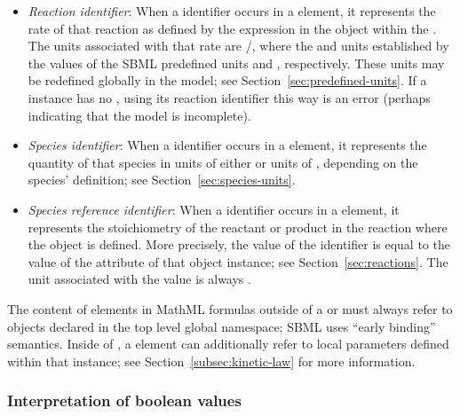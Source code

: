 \begin{itemize}
\begin{itemize}
  \item \emph{Reaction identifier}: When a \Reaction identifier
    occurs in a  element, it represents the rate of that
    reaction as defined by the  expression in
      the \KineticLaw object within the \Reaction.  The
    units associated with that rate are
      /, where the
       and  units established
    by the values of the SBML predefined units
       and , respectively.  These units
      may be redefined globally in the model; see
      Section~\ref{sec:predefined-units}.  If a \Reaction instance
      has no \KineticLaw , using its reaction identifier
      this way is an error (perhaps indicating that the model is
      incomplete).
    
  \item \emph{Species identifier}: When a \Species identifier
    occurs in a  element, it represents the quantity of
    that species in units of either  or units of , depending
      on the species' definition; see
    Section~\ref{sec:species-units}.

  \item \emph{Species reference identifier}: When a
    \SpeciesReference identifier occurs in a  element,
    it represents the stoichiometry of the reactant or product in
    the reaction where the \SpeciesReference object is defined.
    More precisely, the value of the \SpeciesReference
    identifier is equal to the value of the 
    attribute of that \SpeciesReference object instance; see
    Section~\ref{sec:reactions}.  The unit associated with the
    value is always .
    
  \end{itemize}

\end{itemize}

The content of  elements in MathML formulas outside of a
\KineticLaw or \FunctionDefinition must always refer to objects
declared in the top level global namespace; \ie SBML uses ``early
binding'' semantics.  Inside of \KineticLaw, a  element
can additionally refer to local parameters defined within that
\KineticLaw instance; see Section~\ref{subsec:kinetic-law} for
more information.


\subsubsection{Interpretation of boolean values}
\label{sec:handling-booleans}

